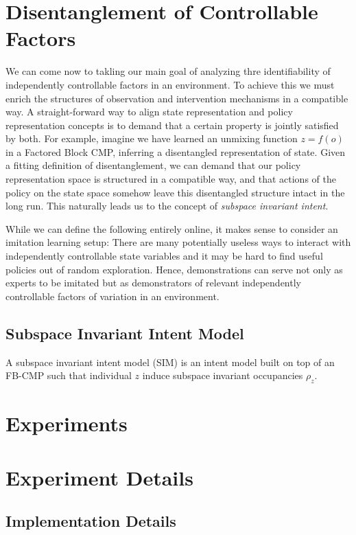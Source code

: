 \documentclass{article}
\theoremstyle{plain}
\theoremstyle{definition}
\theoremstyle{remark}
\begin{document}
\section{Disentanglement of Controllable Factors}
We can come now to takling our main goal of analyzing thre identifiability of independently controllable factors in an environment. To achieve this we must enrich the structures of observation and intervention mechanisms in a compatible way. A straight-forward way to align state representation and policy representation concepts is to demand that a certain property is jointly satisfied by both.
For example, imagine we have learned an unmixing function $z=f(o)$ in a Factored Block CMP, inferring a disentangled representation of state.
Given a fitting definition of disentanglement, we can demand that our policy representation space is structured in a compatible way, and that actions of the policy on the state space somehow leave this disentangled structure intact in the long run. This naturally leads us to the concept of \textit{subspace invariant intent}.

While we can define the following entirely online, it makes sense to consider an imitation learning setup: There are many potentially useless ways to interact with independently controllable state variables and it may be hard to find useful policies out of random exploration. Hence, demonstrations can serve not only as experts to be imitated but as demonstrators of relevant independently controllable factors of variation in an environment.

\subsection{Subspace Invariant Intent Model}
A subspace invariant intent model (SIM) is an intent model built on top of an FB-CMP such that individual $z$ induce subspace invariant occupancies $\rho_z$.

\section{Experiments}
\label{sec:experiments}




\appendix

\section{Experiment Details}
\subsection{Implementation Details}
\end{document}
